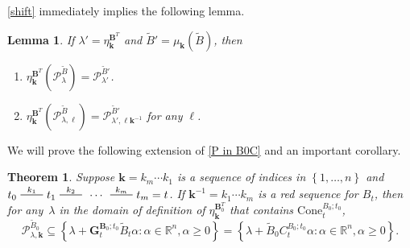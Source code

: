 \documentclass{amsart}
\newtheorem{theorem}[proposition]{Theorem}
\newtheorem{lemma}[proposition]{Lemma}
\theoremstyle{definition}
\theoremstyle{remark}
\numberwithin{equation}{section}
\newcommand{\reals}{\mathbb R}
\newcommand{\edge}{\,\,\rule[2.7pt]{20pt}{0.5pt}\,\,}
\newcommand{\set}[1]{{\left\lbrace #1 \right\rbrace}}
\newcommand{\GG}{{\mathbf G}}
\newcommand{\0}{{\mathbf{0}}}
\newcommand{\Cone}{\mathrm{Cone}}
\newcommand{\kk}{\mathbf{k}}
\renewcommand{\ll}{{\boldsymbol\ell}}
\newcommand{\tB}{{\tilde{B}}}
\newcommand{\BB}{\mathbf{B}}
\renewcommand{\P}{\mathcal{P}}
\begin{document}
\cref{shift} immediately implies the following lemma.
\begin{lemma}\label{shift extended}
If $\lambda'=\eta^{\BB^T}_\kk$ and $\tB'=\mu_\kk(\tB)$, then 
\begin{enumerate}[\quad\bf1.]
\item \label{shift all}
$\eta^{\BB^T}_\kk\!\!(\P^\tB_\lambda)=\P^{\tB'}_{\lambda'}$.
\item \label{shift one}
$\eta^{\BB^T}_\kk\!\!(\P^\tB_{\lambda,\ll})=\P^{\tB'}_{\lambda',\ll\kk^{-1}}$ for any $\ll$.
\end{enumerate}
\end{lemma}



We will prove the following extension of \cref{P in B0C} and an important corollary.

\begin{theorem}\label{P in B0C extended}
Suppose $\kk=k_m\cdots k_1$ is a sequence of indices in $\set{1,\ldots, n}$ and $t_0\overset{k_1}{\edge}t_1\overset{k_2}{\edge}\,\cdots\,\overset{k_m}{\edge}t_m=t$.
If $\kk^{-1}=k_1\cdots k_m$ is a red sequence for $B_t$, then for any~$\lambda$ in the domain of definition of $\eta_\kk^{\BB_0^T}$ that contains $\Cone^{B_0;t_0}_t$,
\[\P^{\tB_0}_{\lambda,\kk}\subseteq\set{\lambda+\GG_t^{\BB_0;t_0}\tB_t\alpha:\alpha\in\reals^n,\alpha\ge0}=\set{\lambda+\tB_0C_t^{B_0;t_0}\alpha:\alpha\in\reals^n,\alpha\ge0}.\]
\end{theorem}
\end{document}
